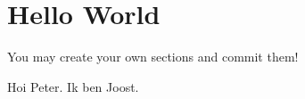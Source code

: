 \documentclass[10pt,a4paper]{article}
\begin{document}
\section{Hello World}
You may create your own sections and commit them!
\begin{section}
Hoi Peter. Ik ben Joost.
\end{section}
\end{document}
